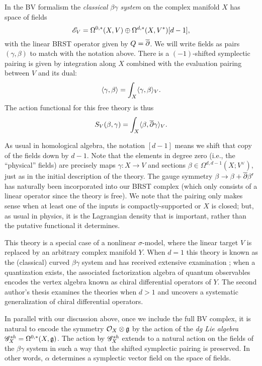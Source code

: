 \begin{dfn}
In the BV formalism the {\em classical $\beta\gamma$ system} on the complex manifold $X$ has space of fields
\[
\mathscr E_V = \Omega^{0,*}(X , V) \oplus \Omega^{d,*}(X , V^*)[d-1],
\]
with the linear BRST operator given by $Q = \overline{\partial}$.
We will write fields as pairs $(\gamma,\beta)$ to match with the notation above.
There is a $(-1)$-shifted symplectic pairing is given by integration along $X$ combined with the evaluation pairing between $V$ and its dual: 
\[
\langle\gamma, \beta\rangle = \int_X \langle\gamma, \beta\rangle_V.
\] 
The action functional for this free theory is thus
\[
S_V (\beta,\gamma) = \int_X \langle\beta, \overline{\partial} \gamma\rangle_{V} .
\]
\end{dfn}

\begin{rmk}
As usual in homological algebra, the notation $[d-1]$ means we shift that copy of the fields down by $d-1$. 
Note that the elements in degree zero (i.e., the ``physical'' fields) are precisely maps $\gamma : X \to V$ and sections $\beta \in\Omega^{d,d-1} (X ; V^\vee)$, just as in the initial description of the theory. 
The gauge symmetry $\beta \to \beta + \overline{\partial} \beta'$ has naturally been incorporated into our BRST complex (which only consists of a linear operator since the theory is free).
We note that the pairing only makes sense when at least one of the inputs is compactly-supported or $X$ is closed;
but, as usual in physics, it is the Lagrangian density that is important, rather than the putative functional it determines.
\end{rmk}


\begin{rmk}
This theory is a special case of a nonlinear $\sigma$-model, where the linear target $V$ is replaced by an arbitrary complex manifold $Y$.
When $d=1$ this theory is known as the (classical) curved $\beta\gamma$ system and has received extensive examination ;
when a quantization exists, the associated factorization algebra of quantum observables encodes the vertex algebra known as chiral differential operators of $Y$.
The second author's thesis  examines the theories when $d>1$ and uncovers a systematic generalization of chiral differential operators.
\end{rmk}

In parallel with our discussion above, once we include the full BV complex, 
it is natural to encode the symmetry $\mathcal O_X \otimes \mathfrak g$ by the action of  the {\em dg Lie algebra} $\mathscr G_X^{sh} = \Omega^{0,*}(X, \mathfrak g)$. 
The action by $\mathscr G_X^{sh}$ extends to a natural action on the fields of the $\beta\gamma$ system in such a way that the shifted symplectic pairing is preserved. 
In other words, $\alpha$ determines a symplectic vector field on the space of fields.

